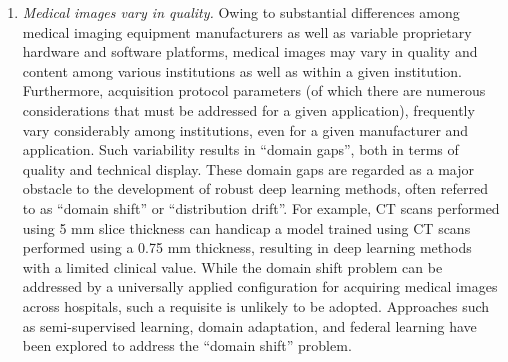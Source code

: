 \begin{enumerate}
    \item \textit{Medical images vary in quality.} Owing to substantial differences among medical imaging equipment manufacturers as well as variable proprietary hardware and software platforms, medical images may vary in quality and content among various institutions as well as within a given institution. Furthermore, acquisition protocol parameters (of which there are numerous considerations that must be addressed for a given application), frequently vary considerably among institutions, even for a given manufacturer and application. Such variability results in ``domain gaps'', both in terms of quality and technical display. These domain gaps are regarded as a major obstacle to the development of robust deep learning methods, often referred to as ``domain shift'' or ``distribution drift''. For example, CT scans performed using 5 mm slice thickness can handicap a model trained using CT scans performed using a 0.75 mm thickness, resulting in deep learning methods with a limited clinical value. While the domain shift problem can be addressed by a universally applied configuration for acquiring medical images across hospitals, such a requisite is unlikely to be adopted. Approaches such as semi-supervised learning, domain adaptation, and federal learning have been explored to address the ``domain shift'' problem.
    

\end{enumerate}

